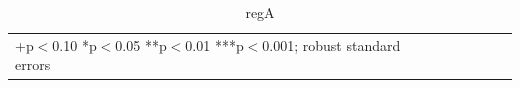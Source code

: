 \documentclass[10pt, letterpaper]{article}
\begin{document}
\begin{spacing}{1.4}
\begin{table}[H]\centering \caption{regA} \label{regA} \begin{scriptsize} \begin{tabular}{p{1.4in}p{.43in}p{.43in}p{.43in}p{.43in}p{.43in}p{.43in}p{.43in}p{.43in}p{.43in}p{.43 in}p{.43in}p{.43 in}}\hline  \hline\multicolumn{6}{l}{+p$<$0.10 *p$<$0.05 **p$<$0.01 ***p$<$0.001; robust standard errors} \end{tabular}\end{scriptsize}\end{table}
 




\end{spacing}
\end{document}

